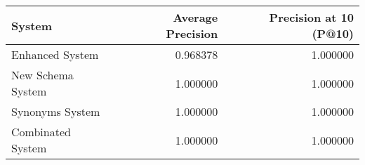 \begin{tabular}{lrr}
\toprule
System & Average Precision & Precision at 10 (P@10) \\
\midrule
Enhanced System & 0.968378 & 1.000000 \\
New Schema System & 1.000000 & 1.000000 \\
Synonyms System & 1.000000 & 1.000000 \\
Combinated System & 1.000000 & 1.000000 \\
\bottomrule
\end{tabular}
